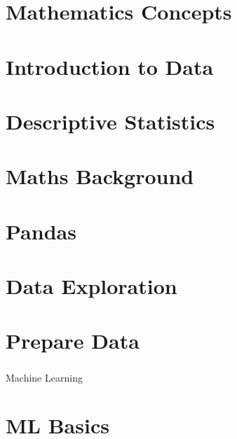

 \section[Maths]{Mathematics Concepts}
 

 \section[DataIntro]{Introduction to Data}
 
 


 \section[Descr]{Descriptive Statistics}
 


 \section[Bak]{Maths Background}
 

 \section[Pandas]{Pandas}
 

 \section[EDA]{Data Exploration}
 

 \section[Prep]{Prepare Data}
 

 \begin{frame}[fragile]\frametitle{}
 \begin{center}
 {\Huge Machine Learning}
 \end{center}
 \end{frame}

 \section[ML Basics]{ML Basics}





